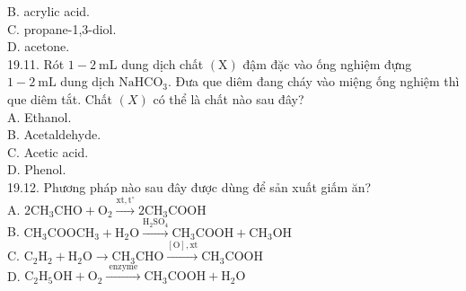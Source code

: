 \documentclass[10pt]{article}
\begin{document}
B. acrylic acid.\\
C. propane-1,3-diol.\\
D. acetone.\\
19.11. Rót $1-2 \mathrm{~mL}$ dung dịch chất $(\mathrm{X})$ đậm đặc vào ống nghiệm đựng $1-2 \mathrm{~mL}$ dung dịch $\mathrm{NaHCO}_{3}$. Đưa que diêm đang cháy vào miệng ống nghiệm thì que diêm tắt. Chất $(X)$ có thể là chất nào sau đây?\\
A. Ethanol.\\
B. Acetaldehyde.\\
C. Acetic acid.\\
D. Phenol.\\
19.12. Phương pháp nào sau đây được dùng để sản xuất giấm ăn?\\
A. $2 \mathrm{CH}_{3} \mathrm{CHO}+\mathrm{O}_{2} \xrightarrow{\mathrm{xt}, \mathrm{t}^{\circ}} 2 \mathrm{CH}_{3} \mathrm{COOH}$\\
B. $\mathrm{CH}_{3} \mathrm{COOCH}_{3}+\mathrm{H}_{2} \mathrm{O} \xrightarrow{\mathrm{H}_{2} \mathrm{SO}_{4}} \mathrm{CH}_{3} \mathrm{COOH}+\mathrm{CH}_{3} \mathrm{OH}$\\
C. $\mathrm{C}_{2} \mathrm{H}_{2}+\mathrm{H}_{2} \mathrm{O} \rightarrow \mathrm{CH}_{3} \mathrm{CHO} \xrightarrow{[\mathrm{O}], \mathrm{xt}} \mathrm{CH}_{3} \mathrm{COOH}$\\
D. $\mathrm{C}_{2} \mathrm{H}_{5} \mathrm{OH}+\mathrm{O}_{2} \xrightarrow{\text { enzyme }} \mathrm{CH}_{3} \mathrm{COOH}+\mathrm{H}_{2} \mathrm{O}$
\end{document}
